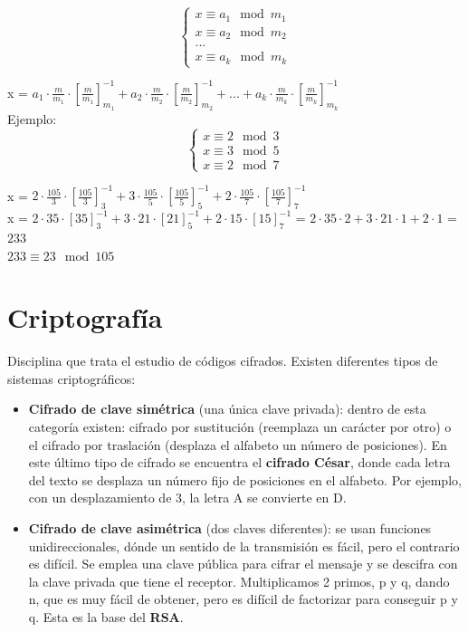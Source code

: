\documentclass{article}
\begin{document}
$$\begin{cases} x \equiv a_1 \mod m_1 \\
x \equiv a_2 \mod m_2 \\
... \\
x \equiv a_k \mod m_k \end{cases}$$

x = $a_1 \cdot \frac{m}{m_1} \cdot [\frac{m}{m_1}]^{-1}_{m_1} + a_2 \cdot \frac{m}{m_2} \cdot [\frac{m}{m_2}]^{-1}_{m_2} + ... + a_k \cdot \frac{m}{m_k} \cdot [\frac{m}{m_k}]^{-1}_{m_k}$ \\

Ejemplo: $$\begin{cases} x \equiv 2 \mod 3 \\
x \equiv 3 \mod 5 \\
x \equiv 2 \mod 7 \end{cases}$$

x = $2 \cdot \frac{105}{3} \cdot [\frac{105}{3}]^{-1}_3 + 3 \cdot \frac{105}{5} \cdot [\frac{105}{5}]^{-1}_5 + 2 \cdot \frac{105}{7} \cdot [\frac{105}{7}]^{-1}_7$ \\

x = $2 \cdot 35 \cdot [35]^{-1}_3 + 3 \cdot 21 \cdot [21]^{-1}_5 + 2 \cdot 15 \cdot [15]^{-1}_7$ = $2 \cdot 35 \cdot 2 + 3 \cdot 21 \cdot 1 + 2 \cdot 1$ = $233$ \\

$233 \equiv 23 \mod 105$

\section{Criptografía}
Disciplina que trata el estudio de códigos cifrados. Existen diferentes tipos de sistemas criptográficos: 
\begin{itemize}
    \item \textbf{Cifrado de clave simétrica} (una única clave privada): dentro de esta categoría existen: cifrado por sustitución (reemplaza un carácter por otro) o el cifrado por traslación (desplaza el alfabeto un número de posiciones). En este último tipo de cifrado se encuentra el \textbf{cifrado César}, donde cada letra del texto se desplaza un número fijo de posiciones en el alfabeto. Por ejemplo, con un desplazamiento de 3, la letra A se convierte en D.

    \item \textbf{Cifrado de clave asimétrica} (dos claves diferentes): se usan funciones unidireccionales, dónde un sentido de la transmisión es fácil, pero el contrario es difícil. Se emplea una clave pública para cifrar el mensaje y se descifra con la clave privada que tiene el receptor. Multiplicamos 2 primos, p y q, dando n, que es muy fácil de obtener, pero es difícil de factorizar para conseguir p y q. Esta es la base del \textbf{RSA}.
\end{itemize}
\end{document}
